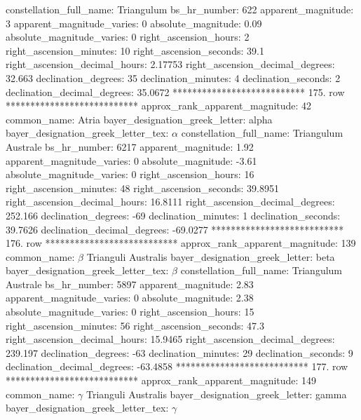            constellation_full_name: Triangulum
                      bs_hr_number: 622
                apparent_magnitude: 3
         apparent_magnitude_varies: 0
                absolute_magnitude: 0.09
         absolute_magnitude_varies: 0
             right_ascension_hours: 2
           right_ascension_minutes: 10
           right_ascension_seconds: 39.1
     right_ascension_decimal_hours: 2.17753
   right_ascension_decimal_degrees: 32.663
               declination_degrees: 35
               declination_minutes: 4
               declination_seconds: 2
       declination_decimal_degrees: 35.0672
*************************** 175. row ***************************
    approx_rank_apparent_magnitude: 42
                       common_name: Atria
    bayer_designation_greek_letter: alpha
bayer_designation_greek_letter_tex: $\alpha$
           constellation_full_name: Triangulum Australe
                      bs_hr_number: 6217
                apparent_magnitude: 1.92
         apparent_magnitude_varies: 0
                absolute_magnitude: -3.61
         absolute_magnitude_varies: 0
             right_ascension_hours: 16
           right_ascension_minutes: 48
           right_ascension_seconds: 39.8951
     right_ascension_decimal_hours: 16.8111
   right_ascension_decimal_degrees: 252.166
               declination_degrees: -69
               declination_minutes: 1
               declination_seconds: 39.7626
       declination_decimal_degrees: -69.0277
*************************** 176. row ***************************
    approx_rank_apparent_magnitude: 139
                       common_name: $\beta$ Trianguli Australis
    bayer_designation_greek_letter: beta
bayer_designation_greek_letter_tex: $\beta$
           constellation_full_name: Triangulum Australe
                      bs_hr_number: 5897
                apparent_magnitude: 2.83
         apparent_magnitude_varies: 0
                absolute_magnitude: 2.38
         absolute_magnitude_varies: 0
             right_ascension_hours: 15
           right_ascension_minutes: 56
           right_ascension_seconds: 47.3
     right_ascension_decimal_hours: 15.9465
   right_ascension_decimal_degrees: 239.197
               declination_degrees: -63
               declination_minutes: 29
               declination_seconds: 9
       declination_decimal_degrees: -63.4858
*************************** 177. row ***************************
    approx_rank_apparent_magnitude: 149
                       common_name: $\gamma$ Trianguli Australis
    bayer_designation_greek_letter: gamma
bayer_designation_greek_letter_tex: $\gamma$
